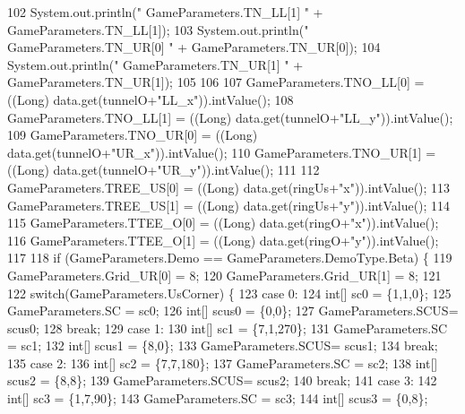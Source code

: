 \begin{DoxyCode}
102       System.out.println(\textcolor{stringliteral}{" GameParameters.TN\_LL[1] "} +  GameParameters.TN\_LL[1]);
103       System.out.println(\textcolor{stringliteral}{" GameParameters.TN\_UR[0] "} +  GameParameters.TN\_UR[0]);
104       System.out.println(\textcolor{stringliteral}{" GameParameters.TN\_UR[1] "} +  GameParameters.TN\_UR[1]);
105 
106 
107       GameParameters.TNO\_LL[0] = ((Long) data.get(tunnelO+\textcolor{stringliteral}{"LL\_x"})).intValue();
108       GameParameters.TNO\_LL[1] = ((Long) data.get(tunnelO+\textcolor{stringliteral}{"LL\_y"})).intValue();
109       GameParameters.TNO\_UR[0] = ((Long) data.get(tunnelO+\textcolor{stringliteral}{"UR\_x"})).intValue();
110       GameParameters.TNO\_UR[1] = ((Long) data.get(tunnelO+\textcolor{stringliteral}{"UR\_y"})).intValue();
111 
112       GameParameters.TREE\_US[0] = ((Long) data.get(ringUs+\textcolor{stringliteral}{"x"})).intValue();
113       GameParameters.TREE\_US[1] = ((Long) data.get(ringUs+\textcolor{stringliteral}{"y"})).intValue();
114 
115       GameParameters.TTEE\_O[0] = ((Long) data.get(ringO+\textcolor{stringliteral}{"x"})).intValue();
116       GameParameters.TTEE\_O[1] = ((Long) data.get(ringO+\textcolor{stringliteral}{"y"})).intValue();
117 
118       \textcolor{keywordflow}{if} (GameParameters.Demo == GameParameters.DemoType.Beta) \{
119         GameParameters.Grid\_UR[0] = 8;
120         GameParameters.Grid\_UR[1] = 8;
121         
122         \textcolor{keywordflow}{switch}(GameParameters.UsCorner) \{
123           \textcolor{keywordflow}{case} 0:
124             \textcolor{keywordtype}{int}[] sc0 = \{1,1,0\};
125             GameParameters.SC = sc0;
126             \textcolor{keywordtype}{int}[] scus0 = \{0,0\};
127             GameParameters.SCUS= scus0;
128             \textcolor{keywordflow}{break};
129           \textcolor{keywordflow}{case} 1:
130             \textcolor{keywordtype}{int}[] sc1 = \{7,1,270\};
131             GameParameters.SC = sc1;
132             \textcolor{keywordtype}{int}[] scus1 = \{8,0\};
133             GameParameters.SCUS= scus1;
134             \textcolor{keywordflow}{break};
135           \textcolor{keywordflow}{case} 2:
136             \textcolor{keywordtype}{int}[] sc2 = \{7,7,180\};
137             GameParameters.SC = sc2;
138             \textcolor{keywordtype}{int}[] scus2 = \{8,8\};
139             GameParameters.SCUS= scus2;
140             \textcolor{keywordflow}{break};
141           \textcolor{keywordflow}{case} 3:
142             \textcolor{keywordtype}{int}[] sc3 = \{1,7,90\};
143             GameParameters.SC = sc3;
144             \textcolor{keywordtype}{int}[] scus3 = \{0,8\};

\end{DoxyCode}
